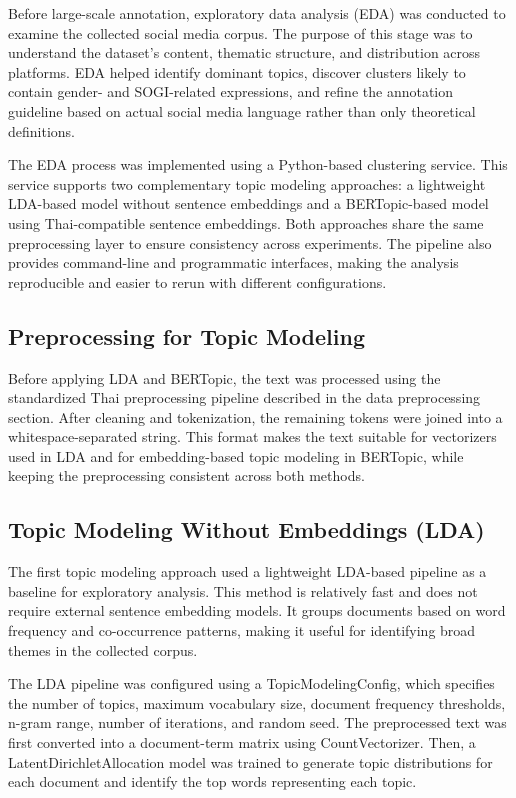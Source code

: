 \documentclass[12pt,oneside,openright,a4paper]{cpe-english-project}
\begin{document}
Before large-scale annotation, exploratory data analysis (EDA) was conducted to examine the collected social media corpus. The purpose of this stage was to understand the dataset's content, thematic structure, and distribution across platforms. EDA helped identify dominant topics, discover clusters likely to contain gender- and SOGI-related expressions, and refine the annotation guideline based on actual social media language rather than only theoretical definitions.

The EDA process was implemented using a Python-based clustering service. This service supports two complementary topic modeling approaches: a lightweight LDA-based model without sentence embeddings and a BERTopic-based model using Thai-compatible sentence embeddings. Both approaches share the same preprocessing layer to ensure consistency across experiments. The pipeline also provides command-line and programmatic interfaces, making the analysis reproducible and easier to rerun with different configurations.

\subsection{Preprocessing for Topic Modeling}

Before applying LDA and BERTopic, the text was processed using the standardized Thai preprocessing pipeline described in the data preprocessing section. After cleaning and tokenization, the remaining tokens were joined into a whitespace-separated string. This format makes the text suitable for vectorizers used in LDA and for embedding-based topic modeling in BERTopic, while keeping the preprocessing consistent across both methods.

\subsection{Topic Modeling Without Embeddings (LDA)}

The first topic modeling approach used a lightweight LDA-based pipeline as a baseline for exploratory analysis. This method is relatively fast and does not require external sentence embedding models. It groups documents based on word frequency and co-occurrence patterns, making it useful for identifying broad themes in the collected corpus.

The LDA pipeline was configured using a TopicModelingConfig, which specifies the number of topics, maximum vocabulary size, document frequency thresholds, n-gram range, number of iterations, and random seed. The preprocessed text was first converted into a document-term matrix using CountVectorizer. Then, a LatentDirichletAllocation model was trained to generate topic distributions for each document and identify the top words representing each topic.
\end{document}
